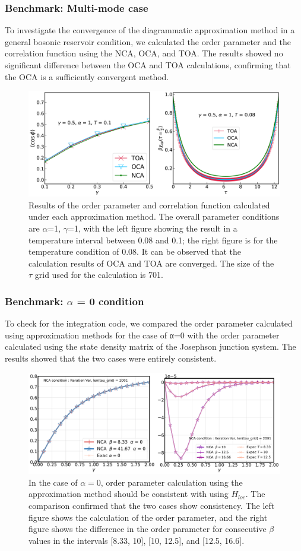 \documentclass{article}
\begin{document}
\begin{spacing}{1.3}
\subsubsection*{Benchmark: Multi-mode case}
To investigate the convergence of the diagrammatic approximation method in a general bosonic reservoir condition, 
we calculated the order parameter and the correlation function using the NCA, OCA, and TOA. 
The results showed no significant difference between the OCA and TOA calculations, confirming that the OCA is a sufficiently convergent method.
\begin{figure}[H]
  \centerline{\includegraphics[width=12cm]{TexFigure/4/4_1_02_Multi.png}}
  \caption{Results of the order parameter and correlation function calculated under each approximation method. 
  The overall parameter conditions are $\alpha$=1, $\gamma$=1, with the left figure showing the result in a temperature interval between 0.08 and 0.1; the right figure is for the temperature condition of 0.08. It can be observed that the calculation results of OCA and TOA are converged. 
  The size of the $\tau$ grid used for the calculation is 701.}
 \end{figure}
\subsubsection*{Benchmark: $\alpha$ = 0 condition}
To check for the integration code, we compared the order parameter calculated using approximation methods for the case of α=0 
with the order parameter calculated using the state density matrix of the Josephson junction system. 
The results showed that the two cases were entirely consistent.
\begin{figure}[H]
  \centerline{\includegraphics[width=12cm]{TexFigure/4/4_1_03_zero.png}}
  \caption{In the case of $\alpha = 0$, order parameter calculation using the approximation method should be consistent with using $H_{loc}$.
  The comparison confirmed that the two cases show consistency. The left figure shows the calculation of the order parameter, 
  and the right figure shows the difference in the order parameter for consecutive $\beta$ values
  in the intervals [8.33, 10], [10, 12.5], and [12.5, 16.6].}
 \end{figure}
\pagebreak

\end{spacing}
\end{document}
